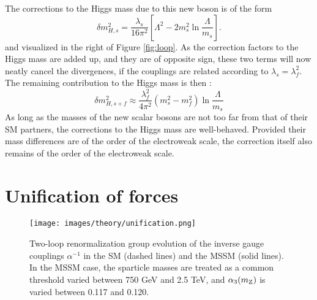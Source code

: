 The corrections to the Higgs mass due to this new boson is of the form
\begin{equation}
\delta m_{H,s}^{2}=\frac{\lambda_{s}}{16\pi^{2}}\left[\Lambda^{2}-2m_{s}^{2}\ln\frac{\Lambda}{m_{s}}\right].
\end{equation}                                                                                                                 
and visualized in the right of Figure \ref{fig:loop}. 
As the correction factors to the Higgs mass are added up, and they are of opposite sign, these two terms will now neatly cancel the divergences, if the couplings are related according to $\lambda_{s}=\lambda_{f}^{2}$. 
The remaining contribution to the Higgs mass is then \cite{Pape:2006ar}:
\begin{equation}
\delta m_{H,s+f}^{2}\approx\frac{\lambda_{f}^{2}}{4\pi^{2}}(m_{s}^{2}-m_{f}^{2})\ln\frac{\Lambda}{m_{s}}
\end{equation}                                                                                                                 
As long as the masses of the new scalar bosons are not too far from that of their SM partners, the corrections to the Higgs mass are well-behaved.
Provided their mass differences are of the order of the electroweak scale, the correction itself also remains of the order of the electroweak scale. 
\section{Unification of forces}
\noindent\justify
\begin{figure}[htbp!]
\begin{center}
    \texttt{[image: images/theory/unification.png]}
    \caption{Two-loop renormalization group evolution of the inverse gauge couplings $\alpha^{-1}$ in the SM (dashed lines) and the MSSM (solid lines). 
In the MSSM case, the sparticle masses are treated as a common threshold varied between 750 GeV and 2.5 TeV, and $\alpha_{3}(m_{\mathrm{Z}})$ is varied between 0.117 and 0.120. \cite{Martin:1997ns}}
\label{fig:unification}
\end{center}
\end{figure}                                                                                                                                                                                      
